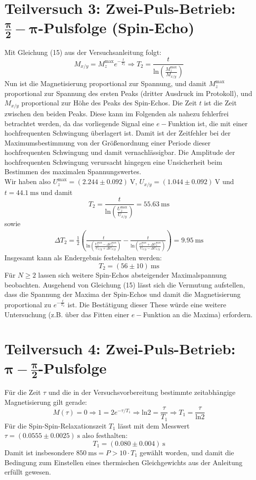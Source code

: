 \documentclass[11pt,a4paper,oneside]{scrartcl}
\begin{document}
\section{Teilversuch 3: Zwei-Puls-Betrieb: $\mathbf{\frac{\pi}{2}-\pi}$-Pulsfolge (Spin-Echo)}
Mit Gleichung (15) aus der Versuchsanleitung folgt:
$$
M_{x/y}=M_z^{\mathrm{max}}e^{-\frac{t}{T_2}}\Rightarrow T_2=\frac{t}{\mathrm{ln}\left(\frac{M_z^{\mathrm{max}}}{M_{x/y}}\right)}
$$
Nun ist die Magnetisierung proportional zur Spannung, und damit $M_z^{\mathrm{max}}$ proportional zur Spannung des ersten Peaks (dritter Ausdruck im Protokoll), und $M_{x/y}$ proportional zur Höhe des Peaks des Spin-Echos. Die Zeit $t$ ist die Zeit zwischen den beiden Peaks. Diese kann im Folgenden als nahezu fehlerfrei betrachtet werden, da das vorliegende Signal eine $e-$Funktion ist, die mit einer hochfrequenten Schwingung überlagert ist. Damit ist der Zeitfehler bei der Maximumsbestimmung von der Größenordnung einer Periode dieser hochfrequenten Schwingung und damit vernachlässigbar. Die Amplitude der hochfrequenten Schwingung verursacht hingegen eine Unsicherheit beim Bestimmen des maximalen Spannungswertes.\\
Wir haben also $U_z^{\mathrm{max}}=(2.244\pm0.092)\ \mathrm V$, $U_{x/y}=(1.044\pm0.092)\ \mathrm V$ und $t=44.1\ \mathrm{ms}$ und damit
$$
T_2=\frac{t}{\mathrm{ln}\left(\frac{U_z^{\mathrm{max}}}{U_{x/y}}\right)}=55.63\ \mathrm{ms}
$$
sowie
\begin{align*}
\Delta T_2 =\frac{1}{2}\left(\frac{t}{\mathrm{ln}\left( \frac{U_z^{\mathrm{max}}-\Delta U_z^{\mathrm{max}}}{U_{x/y}+\Delta U_{x/y}}\right)}-\frac{t}{\mathrm{ln}\left( \frac{U_z^{\mathrm{max}}+\Delta U_z^{\mathrm{max}}}{U_{x/y}-\Delta U_{x/y}}\right)}\right) = 9.95\ \mathrm{ms}
\end{align*}
Insgesamt kann als Endergebnis festehalten werden:
$$
T_2=(56\pm10)\ \mathrm{ms}
$$
Für $N\geq 2$ lassen sich weitere Spin-Echos absteigender Maximalspannung beobachten. Ausgehend von Gleichung (15) lässt sich die Vermutung aufstellen, dass die Spannung der Maxima der Spin-Echos und damit die Magnetisierung proportional zu $e^{-\frac{t}{T_2}}$ ist. Die Bestätigung dieser These würde eine weitere Untersuchung (z.B. über das Fitten einer $e-$Funktion an die Maxima) erfordern.
\section{Teilversuch 4: Zwei-Puls-Betrieb: $\mathbf{\pi -\frac{\pi}{2}}$-Pulsfolge}
Für die Zeit $\tau$ und die in der Versuchsvorbereitung bestimmte zeitabhängige Magnetisierung gilt gerade:
$$
M(\tau)=0\Rightarrow 1=2e^{-\tau/T_1}\Rightarrow \mathrm{ln}2=\frac{\tau}{T_1}\Rightarrow T_1=\frac{\tau}{\mathrm{ln}2}
$$
Für die Spin-Spin-Relaxationszeit $T_1$ lässt mit dem Messwert $\tau=(0.0555\pm 0.0025)\ \mathrm s$ also festhalten:
$$
T_1=(0.080\pm 0.004)\ \mathrm s
$$
Damit ist insbesondere $850\ \mathrm{ms}=P>10\cdot T_1$ gewählt worden, und damit die Bedingung zum Einstellen eines thermischen Gleichgewichts aus der Anleitung erfüllt gewesen.
\end{document}
